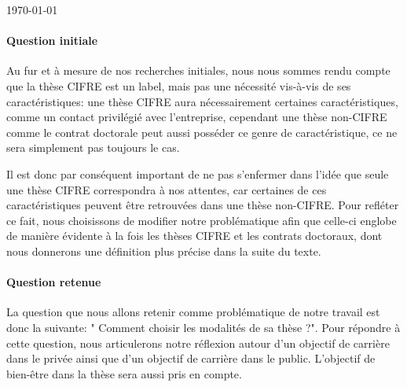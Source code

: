 \documentclass[12pt]{article}
\begin{document}
\begin{titlepage}
	\vfill
	
	\begin{center}
    \end{center}
	
	\vfill\vfill %
	
	{\large\today} %

	
	
	\vfill %
	
\end{titlepage}

\paragraph{Question initiale} %

Au fur et à mesure de nos recherches initiales, nous nous sommes rendu compte que la thèse CIFRE est un label, mais pas une nécessité vis-à-vis de ses caractéristiques: une thèse CIFRE aura nécessairement certaines caractéristiques, comme un contact privilégié avec l'entreprise, cependant une thèse non-CIFRE comme le contrat doctorale peut aussi posséder ce genre de caractéristique, ce ne sera simplement pas toujours le cas.

Il est donc par conséquent important de ne pas s'enfermer dans l'idée que seule une thèse CIFRE correspondra à nos attentes, car certaines de ces caractéristiques peuvent être retrouvées dans une thèse non-CIFRE. Pour refléter ce fait, nous choisissons de modifier notre problématique afin que celle-ci englobe de manière évidente à la fois les thèses CIFRE et les contrats doctoraux, dont nous donnerons une définition plus précise dans la suite du texte.

\paragraph{Question retenue} La question que nous allons retenir comme problématique de notre travail est donc la suivante: " Comment choisir les modalités de sa thèse ?". Pour répondre à cette question, nous articulerons notre réflexion autour d'un objectif de carrière dans le privée ainsi que d'un objectif de carrière dans le public. L'objectif de bien-être dans la thèse sera aussi pris en compte.
\end{document}
